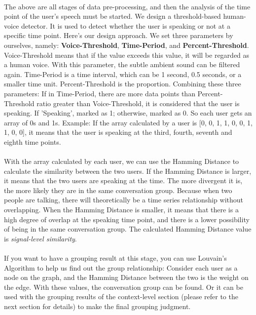 \documentclass[a4paper,12pt]{report}
\begin{document}
\paragraph{}
The above are all stages of data pre-processing, and then the analysis of the time point of the user's speech must be started. We design a threshold-based human-voice detector. It is used to detect whether the user is speaking or not at a specific time point. Here's our design approach. We set three parameters by ourselves, namely: \textbf{Voice-Threshold}, \textbf{Time-Period}, and \textbf{Percent-Threshold}. Voice-Threshold means that if the value exceeds this value, it will be regarded as a human voice. With this parameter, the subtle ambient sound can be filtered again. Time-Period is a time interval, which can be 1 second, 0.5 seconds, or a smaller time unit. Percent-Threshold is the proportion. Combining these three parameters: If in Time-Period, there are more data points than Percent-Threshold ratio greater than Voice-Threshold, it is considered that the user is speaking. If 'Speaking', marked as 1; otherwise, marked as 0. So each user gets an array of 0s and 1s. Example: If the array calculated by a user is [0, 0, 1, 1, 0, 0, 1, 1, 0, 0], it means that the user is speaking at the third, fourth, seventh and eighth time points.
\paragraph{}
With the array calculated by each user, we can use the Hamming Distance to calculate the similarity between the two users. If the Hamming Distance is larger, it means that the two users are speaking at the time. The more divergent it is, the more likely they are in the same conversation group. Because when two people are talking, there will theoretically be a time series relationship without overlapping. When the Hamming Distance is smaller, it means that there is a high degree of overlap at the speaking time point, and there is a lower possibility of being in the same conversation group. The calculated Hamming Distance value is \emph{signal-level similarity}.
\paragraph{}
If you want to have a grouping result at this stage, you can use Louvain's Algorithm to help us find out the group relationship: Consider each user as a node on the graph, and the Hamming Distance between the two is the weight on the edge. With these values, the conversation group can be found. Or it can be used with the grouping results of the context-level section (please refer to the next section for details) to make the final grouping judgment.
\end{document}

